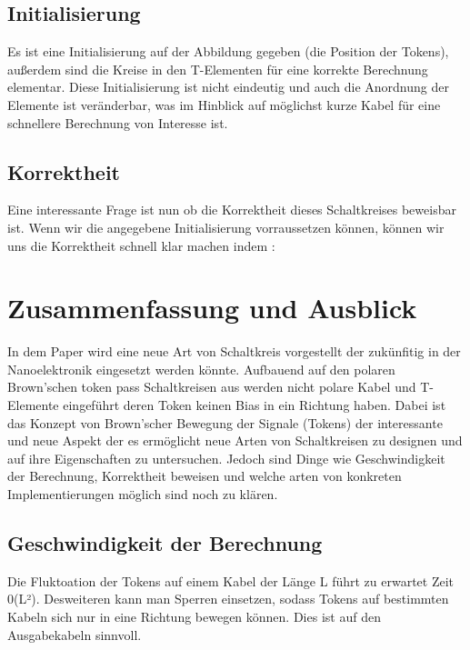 \documentclass[11pt,a4paper]{article}
\begin{document}
\subsection{Initialisierung}
Es ist eine Initialisierung auf der Abbildung gegeben (die Position der Tokens), 
außerdem sind die Kreise in den T-Elementen für eine korrekte Berechnung
elementar.
%
Diese Initialisierung ist nicht eindeutig und auch die Anordnung der
Elemente ist veränderbar, was im Hinblick auf möglichst kurze Kabel 
für eine schnellere Berechnung von Interesse ist.


\subsection{Korrektheit}
Eine interessante Frage ist nun ob die Korrektheit dieses Schaltkreises
beweisbar ist. Wenn wir die angegebene Initialisierung vorraussetzen können,
können wir uns die Korrektheit schnell klar machen indem :



\section{Zusammenfassung und Ausblick}
In dem Paper \cite{Peper_nonPolar_2018} wird eine neue Art
von Schaltkreis vorgestellt der zukünfitig in der Nanoelektronik eingesetzt
werden könnte.
%
Aufbauend auf den polaren Brown'schen token pass Schaltkreisen aus 
\cite{Peper_Fundamentals_2013} werden nicht polare Kabel und T-Elemente 
eingeführt deren Token keinen Bias in ein Richtung haben. 
%
Dabei ist das Konzept von Brown'scher Bewegung der Signale (Tokens) 
der interessante und neue Aspekt der es ermöglicht neue Arten von Schaltkreisen 
zu designen und auf ihre Eigenschaften zu untersuchen.
%
Jedoch sind Dinge wie Geschwindigkeit der Berechnung, Korrektheit beweisen und 
welche arten von konkreten Implementierungen möglich sind noch zu klären.


\subsection{Geschwindigkeit der Berechnung}
Die Fluktoation der Tokens auf einem Kabel der Länge L führt zu 
erwartet Zeit 0(L²).
%
Desweiteren kann man Sperren einsetzen, sodass Tokens
auf bestimmten Kabeln sich nur in eine Richtung bewegen können. 
%
Dies ist auf den Ausgabekabeln sinnvoll.
\end{document}
